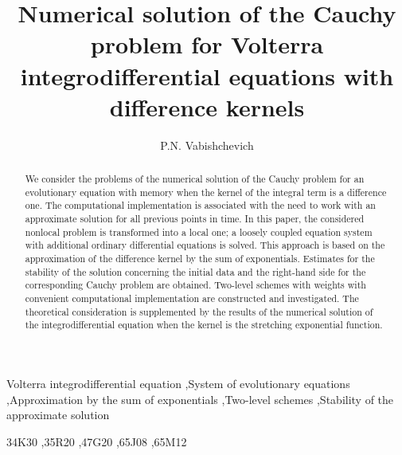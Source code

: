 \documentclass[3p]{elsarticle}
\numberwithin{equation}{section}
\begin{document}
\begin{frontmatter}

\title{Numerical solution of the Cauchy problem for Volterra
integrodifferential equations with difference kernels}

\author{P.N. Vabishchevich}

\address[lab1]{Nuclear Safety Institute, Russian Academy of Sciences,
              52, B. Tulskaya, 115191 Moscow, Russia}

\address[lab2]{North-Caucasus Center for Mathematical Research, North-Caucasus Federal University, 
                   1, Pushkin Street, 355017 Stavropol, Russia}

\begin{abstract}
We consider the problems of the numerical solution of the Cauchy problem for an evolutionary equation with memory when the kernel of the integral term is a difference one.
The computational implementation is associated with the need to work with an approximate solution for all previous points in time.
In this paper, the considered nonlocal problem is transformed into a local one; a loosely coupled equation system with additional ordinary differential equations is solved.
This approach is based on the approximation of the difference kernel by the sum of exponentials.
Estimates for the stability of the solution concerning the initial data and the right-hand side for the corresponding Cauchy problem are obtained.
Two-level schemes with weights with convenient computational implementation are constructed and investigated.
The theoretical consideration is supplemented by the results of the numerical solution of the integrodifferential equation when the kernel is the stretching exponential function.
\end{abstract}

\begin{keyword}
Volterra integrodifferential equation \sep System of evolutionary equations
\sep Approximation by the sum of exponentials \sep Two-level schemes \sep Stability of the approximate solution

\MSC 34K30  \sep 35R20 \sep  47G20 \sep 65J08  \sep 65M12   
\end{keyword}

\end{frontmatter}
\end{document}
